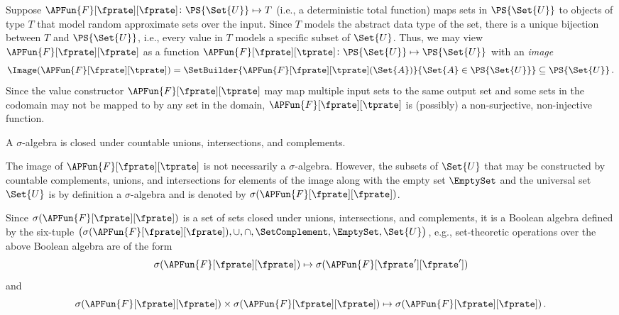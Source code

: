 \documentclass[ ../main.tex]{subfiles}
\newcommand{\ctor}[2]{\APFun{F}[#1][#2]}
\begin{document}
Suppose $\ctor{\fprate}{\fprate} \colon \PS{\Set{U}} \mapsto T$ (i.e., a deterministic total function) maps sets in $\PS{\Set{U}}$ to objects of type $T$ that model random approximate sets over the input.
Since $T$ models the abstract data type of the set, there is a unique bijection between $T$ and $\PS{\Set{{U}}}$, i.e., every value in $T$ models a specific subset of $\Set{U}$.
Thus, we may view $\ctor{\fprate}{\fprate}$ as a function $\ctor{\fprate}{\tprate} \colon \PS{\Set{U}} \mapsto \PS{\Set{U}}$ with an \emph{image}
\begin{equation}
\Image(\ctor{\fprate}{\tprate}) = \SetBuilder{\ctor{\fprate}{\tprate}(\Set{A})}{\Set{A} \in \PS{\Set{U}}} \subseteq \PS{\Set{U}}\,.
\end{equation}
Since the value constructor $\ctor{\fprate}{\tprate}$ may map multiple input sets to the same output set and some sets in the codomain may not be mapped to by any set in the domain, $\ctor{\fprate}{\tprate}$ is (possibly) a non-surjective, non-injective function.



\begin{definition}
A $\sigma$-algebra is closed under countable unions, intersections, and complements.
\end{definition}
The image of $\ctor{\fprate}{\tprate}$ is not necessarily a $\sigma$-algebra.
However, the subsets of $\Set{U}$ that may be constructed by countable complements, unions, and intersections for elements of the image along with the empty set $\EmptySet$ and the universal set $\Set{U}$ is by definition a $\sigma$-algebra and is denoted by $\sigma(\ctor{\fprate}{\fprate})$.

Since $\sigma(\ctor{\fprate}{\fprate})$ is a set of sets closed under unions, intersections, and complements, it is a Boolean algebra defined by the six-tuple 
$\left(
    \sigma(\ctor{\fprate}{\fprate}), \cup, \cap, \SetComplement, \EmptySet,\Set{U}
\right)$,
e.g., set-theoretic operations over the above Boolean algebra are of the form
\begin{equation}
\sigma(\ctor{\fprate}{\fprate}) \mapsto \sigma(\ctor{\fprate'}{\fprate'})
\end{equation}
and
\begin{equation}
    \sigma(\ctor{\fprate}{\fprate}) \times \sigma(\ctor{\fprate}{\fprate}) \mapsto \sigma(\ctor{\fprate}{\fprate})\,.
\end{equation}
\end{document}
